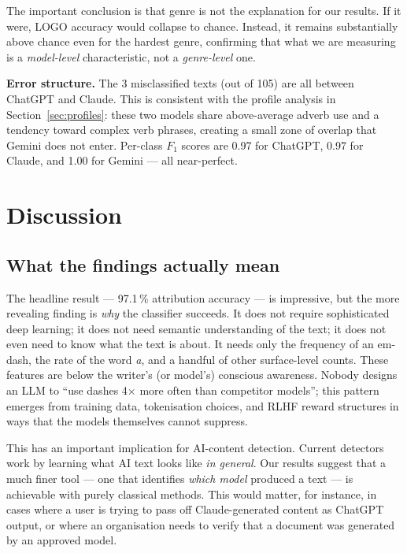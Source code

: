 \documentclass[11pt,a4paper]{article}
\begin{document}
The important conclusion is that genre is not the explanation for our
results. If it were, LOGO accuracy would collapse to chance. Instead,
it remains substantially above chance even for the hardest genre,
confirming that what we are measuring is a \emph{model-level}
characteristic, not a \emph{genre-level} one.

\textbf{Error structure.} The 3 misclassified texts (out of 105) are
all between ChatGPT and Claude. This is consistent with the profile
analysis in Section~\ref{sec:profiles}: these two models share
above-average adverb use and a tendency toward complex verb phrases,
creating a small zone of overlap that Gemini does not enter. Per-class
$F_1$ scores are 0.97 for ChatGPT, 0.97 for Claude, and 1.00 for
Gemini --- all near-perfect.

\section{Discussion}
\label{sec:discussion}

\subsection{What the findings actually mean}

The headline result --- 97.1\,\% attribution accuracy --- is
impressive, but the more revealing finding is \emph{why} the
classifier succeeds. It does not require sophisticated deep learning;
it does not need semantic understanding of the text; it does not even
need to know what the text is about. It needs only the frequency of
an em-dash, the rate of the word \textit{a}, and a handful of other
surface-level counts. These features are below the writer's (or
model's) conscious awareness. Nobody designs an LLM to ``use dashes
4$\times$ more often than competitor models''; this pattern emerges
from training data, tokenisation choices, and RLHF reward structures
in ways that the models themselves cannot suppress.

This has an important implication for AI-content detection. Current
detectors work by learning what AI text looks like \emph{in general}.
Our results suggest that a much finer tool --- one that identifies
\emph{which model} produced a text --- is achievable with purely
classical methods. This would matter, for instance, in cases where a
user is trying to pass off Claude-generated content as ChatGPT output,
or where an organisation needs to verify that a document was generated
by an approved model.
\end{document}
